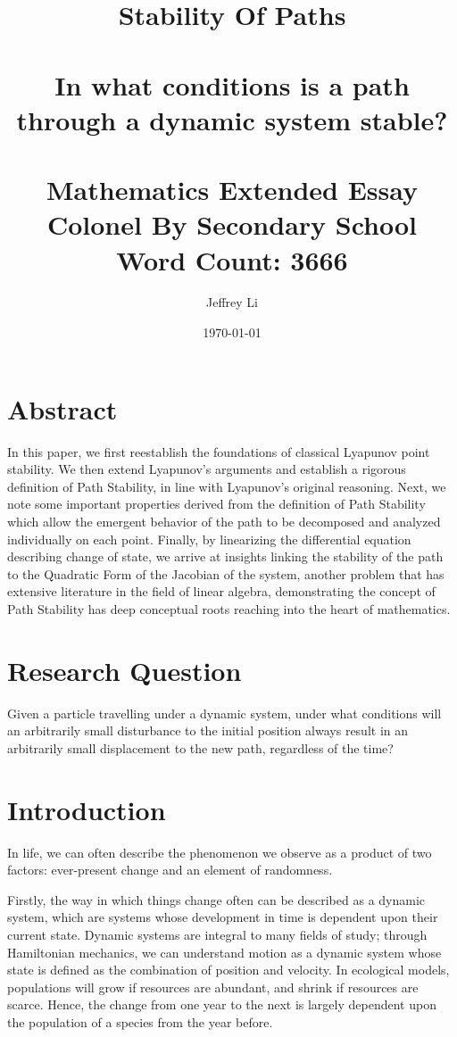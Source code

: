\documentclass{article}
\title{
  {\LARGE
   \textbf{Stability Of Paths}
   }\\~\\
   {\large
    \textbf{In what conditions is a path through a dynamic system stable?}
   }\\~\\
  {\large Mathematics Extended Essay}\\
  {\large Colonel By Secondary School} \\
  {\large Word Count: 3666}
}
\author{Jeffrey Li}
\date{\today}
\theoremstyle{definition}
\theoremstyle{remark}
\begin{document}
\maketitle
\break

\section*{Abstract}
In this paper, we first reestablish the foundations of classical
Lyapunov point stability. We then extend Lyapunov's arguments
and establish a rigorous definition of Path Stability, in line 
with Lyapunov's original reasoning. Next, we note some important 
properties derived from the definition of Path Stability which 
allow the emergent behavior of the path to be decomposed and 
analyzed individually on each point. Finally, by linearizing
the differential equation describing change of state, we arrive at insights
linking the stability of the path to the Quadratic Form of
the Jacobian of the system, another problem that has extensive 
literature in the field of linear algebra, demonstrating
the concept of Path Stability has deep conceptual roots
reaching into the heart of mathematics.

\break

\tableofcontents
\break


\section{Research Question}
Given a particle travelling under a dynamic system, 
under what conditions will an arbitrarily small disturbance to the initial 
position always result in an arbitrarily small displacement to the new path,
regardless of the time? 

\section{Introduction}
In life, we can often describe the phenomenon we observe as a product of two factors:
ever-present change and an element of randomness.

Firstly, the way in which things change often can be described as a dynamic system,
which are systems whose development in time is dependent upon their current state. Dynamic systems are integral to 
many fields of study; through Hamiltonian mechanics, we can understand motion
as a dynamic system whose state is defined as the combination of position and velocity.
In ecological models, populations will grow if resources are abundant, and shrink if
resources are scarce. Hence, the change from one year to the next is largely dependent
upon the population of a species from the year before. 
\end{document}
